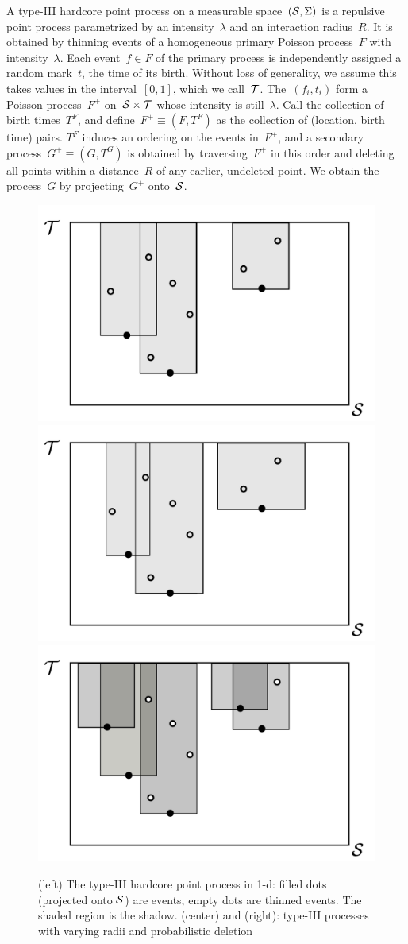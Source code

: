 \documentclass{statsoc}
\begin{document}
   A \matern type-III hardcore point process on a measurable space~$({\mathcal S},\Sigma)$
 is a repulsive point process parametrized by an intensity~$\lambda$ and an 
interaction radius~$R$. It is obtained by thinning events
of a homogeneous {primary} Poisson process~$F$ with intensity~$\lambda$. 
Each event~${f \in F}$ of the primary process is independently assigned a random mark~$t$, the time of its
birth. Without loss of generality, we assume this takes values in the interval~$[0,1]$, which
we call~${\mathcal T}$. %
The~$(f_i, t_i)$ form a Poisson process~${F}^{+}$
on~${{\mathcal S} \times {\mathcal T}}$ whose intensity is still~$\lambda$. 
Call the collection of birth times~$T^F$, and define~${F^{+} \equiv (F,T^F)}$ as the collection of (location, birth time) pairs. $T^F$ induces an ordering on the 
events in~${F}^{+}$, %
and a secondary process~${G^{+} \equiv (G, T^G)}$ is obtained by traversing~$F^{+}$ in this order and deleting all points within 
a distance~$R$ of any {earlier}, {undeleted} point. We obtain the \matern process~$G$ by projecting~$G^{+}$ onto~${\mathcal S}$.

   \begin{figure}
   \centering
     \includegraphics[width=.3\textwidth]{figs/matern3_fig.pdf}
    \includegraphics[width=.3\textwidth]{figs/matern3_fig_sc.pdf}
    \includegraphics[width=.3\textwidth]{figs/matern3_fig_prob.pdf}
 \caption[The \matern type-III hardcore point process]{(left) The \matern type-III hardcore point process in 1-d: filled dots (projected
  onto ${\mathcal S}$) are \matern events, empty dots are thinned events.  The shaded
 region is the shadow.
(center) and (right): \matern type-III processes with varying radii and probabilistic deletion}
   \label{fig:matern3_fig}
   \end{figure}
\end{document}
